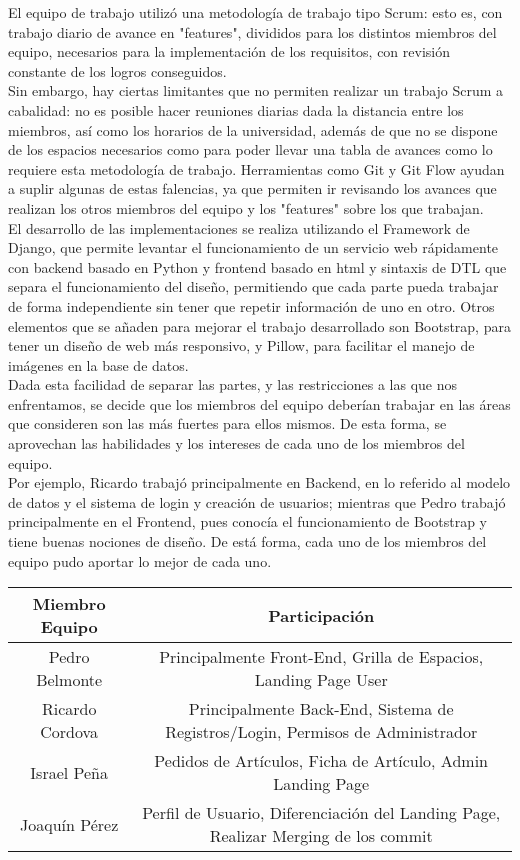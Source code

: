 El equipo de trabajo utilizó una metodología de trabajo tipo Scrum: esto es, con trabajo diario de avance en "features", divididos para los distintos miembros del equipo, necesarios para la implementación de los requisitos, con revisión constante de los logros conseguidos. \\
Sin embargo, hay ciertas limitantes que no permiten realizar un trabajo Scrum a cabalidad: no es posible hacer reuniones diarias dada la distancia entre los miembros, así como los horarios de la universidad, además de que no se dispone de los espacios necesarios como para poder llevar una tabla de avances como lo requiere esta metodología de trabajo. Herramientas como Git y Git Flow ayudan a suplir algunas de estas falencias, ya que permiten ir revisando los avances que realizan los otros miembros del equipo y los "features" sobre los que trabajan.\\
El desarrollo de las implementaciones se realiza utilizando el Framework de Django, que permite levantar el funcionamiento de un servicio web rápidamente con backend basado en Python y frontend basado en html y sintaxis de DTL que separa el funcionamiento del diseño, permitiendo que cada parte pueda trabajar de forma independiente sin tener que repetir información de uno en otro. Otros elementos que se añaden para mejorar el trabajo desarrollado son Bootstrap, para tener un diseño de web más responsivo, y Pillow, para facilitar el manejo de imágenes en la base de datos. \\
Dada esta facilidad de separar las partes, y las restricciones a las que nos enfrentamos, se decide que los miembros del equipo deberían trabajar en las áreas que consideren son las más fuertes para ellos mismos. De esta forma, se aprovechan las habilidades y los intereses de cada uno de los miembros del equipo. \\
Por ejemplo, Ricardo trabajó principalmente en Backend, en lo referido al modelo de datos y el sistema de login y creación de usuarios; mientras que Pedro trabajó principalmente en el Frontend, pues conocía el funcionamiento de Bootstrap y tiene buenas nociones de diseño. De está forma, cada uno de los miembros del equipo pudo aportar lo mejor de cada uno. \\


\begin{table}[H]
  \centering
	\begin{tabular}{|c|c|}
	\hline 
	Miembro Equipo & Participación \\ 
	\hline 
	Pedro Belmonte & 
	Principalmente Front-End, Grilla de Espacios, Landing Page User
	\\ 
	\hline 
	Ricardo Cordova & 
	Principalmente Back-End, Sistema de Registros/Login, Permisos de Administrador
	\\ 
 	\hline 
	Israel Peña & 
	Pedidos de Artículos, Ficha de Artículo, Admin Landing Page
	\\ 
	\hline 
	Joaquín Pérez &
	Perfil de Usuario, Diferenciación del Landing Page, Realizar Merging de los commit 
	\\ 
	\hline 
	\end{tabular} 
\end{table}

